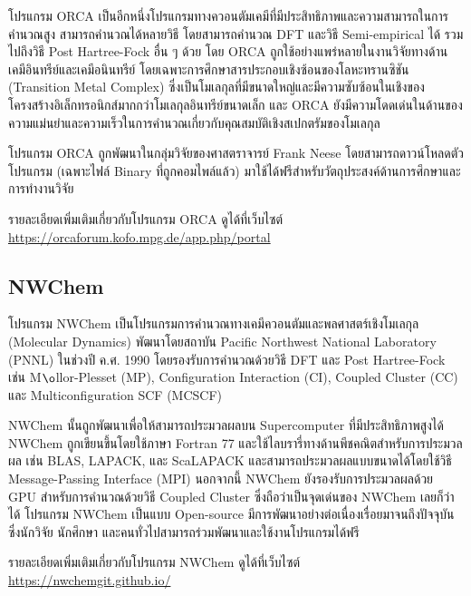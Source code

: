 โปรแกรม ORCA เป็นอีกหนึ่งโปรแกรมทางควอนตัมเคมีที่มีประสิทธิภาพและความสามารถในการคำนวณสูง\autocite{neese2012,neese2018} 
สามารถคำนวณได้หลายวิธี โดยสามารถคำนวณ DFT และวิธี Semi-empirical ได้ รวมไปถึงวิธี Post Hartree-Fock อื่น ๆ ด้วย โดย ORCA 
ถูกใช้อย่างแพร่หลายในงานวิจัยทางด้านเคมีอินทรีย์และเคมีอนินทรีย์ โดยเฉพาะการศึกษาสารประกอบเชิงซ้อนของโลหะทรานซิชัน (Transition 
Metal Complex) ซึ่งเป็นโมเลกุลที่มีขนาดใหญ่และมีความซับซ้อนในเชิงของโครงสร้างอิเล็กทรอนิกส์มากกว่าโมเลกุลอินทรีย์ขนาดเล็ก และ ORCA 
ยังมีความโดดเด่นในด้านของความแม่นยำและความเร็วในการคำนวณเกี่ยวกับคุณสมบัติเชิงสเปกตรัมของโมเลกุล

โปรแกรม ORCA ถูกพัฒนาในกลุ่มวิจัยของศาสตราจารย์ Frank Neese โดยสามารถดาวน์โหลดตัวโปรแกรม (เฉพาะไฟล์ Binary ที่ถูกคอมไพล์แล้ว)
มาใช้ได้ฟรีสำหรับวัตถุประสงค์ด้านการศึกษาและการทำงานวิจัย 

รายละเอียดเพิ่มเติมเกี่ยวกับโปรแกรม ORCA ดูได้ที่เว็บไซต์ \url{https://orcaforum.kofo.mpg.de/app.php/portal}

\subsection{NWChem}
\label{ssec:nwchem}

โปรแกรม NWChem เป็นโปรแกรมการคำนวณทางเคมีควอนตัมและพลศาสตร์เชิงโมเลกุล (Molecular Dynamics)\autocite{apra2020} 
พัฒนาโดยสถาบัน Pacific Northwest National Laboratory (PNNL) ในช่วงปี ค.ศ. 1990 โดยรองรับการคำนวณด้วยวิธี DFT และ 
Post Hartree-Fock เช่น M$\o$llor-Plesset (MP), Configuration Interaction (CI), Coupled Cluster (CC) และ
Multiconfiguration SCF (MCSCF) 

NWChem นั้นถูกพัฒนาเพื่อให้สามารถประมวลผลบน Supercomputer ที่มีประสิทธิภาพสูงได้ NWChem ถูกเขียนขึ้นโดยใช้ภาษา Fortran 77
และใช้ไลบรารี่ทางด้านพีชคณิตสำหรับการประมวลผล เช่น BLAS, LAPACK, และ ScaLAPACK และสามารถประมวลผลแบบขนาดได้โดยใช้วิธี 
Message-Passing Interface (MPI) นอกจากนี้ NWChem ยังรองรับการประมวลผลด้วย GPU สำหรับการคำนวณด้วยวิธี Coupled Cluster 
ซึ่งถือว่าเป็นจุดเด่นของ NWChem เลยก็ว่าได้ โปรแกรม NWChem เป็นแบบ Open-source มีการพัฒนาอย่างต่อเนื่องเรื่อยมาจนถึงปัจจุบัน ซึ่งนักวิจัย 
นักศึกษา และคนทั่วไปสามารถร่วมพัฒนาและใช้งานโปรแกรมได้ฟรี

รายละเอียดเพิ่มเติมเกี่ยวกับโปรแกรม NWChem ดูได้ที่เว็บไซต์ \url{https://nwchemgit.github.io/}
